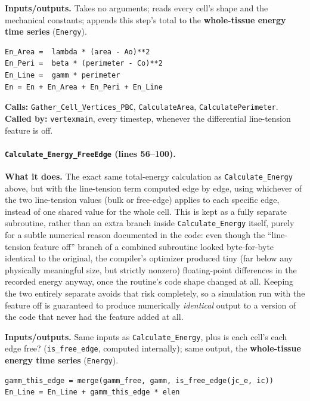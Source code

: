 \documentclass[11pt]{article}
\begin{document}
\textbf{Inputs/outputs.} Takes no arguments; reads every cell's shape and the
mechanical constants; appends this step's total to the \textbf{whole-tissue energy time
series} (\texttt{Energy}).

\begin{lstlisting}[caption={The three energy terms summed per cell in \texttt{Calculate\_Energy}.}]
En_Area =  lambda * (area - Ao)**2
En_Peri =  beta * (perimeter - Co)**2
En_Line =  gamm * perimeter
En = En + En_Area + En_Peri + En_Line
\end{lstlisting}

\textbf{Calls:} \texttt{Gather\_Cell\_Vertices\_PBC}, \texttt{CalculateArea},
\texttt{CalculatePerimeter}. \textbf{Called by:} \texttt{vertexmain}, every timestep,
whenever the differential line-tension feature is off.

\paragraph{\texttt{Calculate\_Energy\_FreeEdge} (lines 56--100).}
\textbf{What it does.} The exact same total-energy calculation as
\texttt{Calculate\_Energy} above, but with the line-tension term computed edge by edge,
using whichever of the two line-tension values (bulk or free-edge)
applies to each specific edge, instead of one shared value for the whole cell. This is
kept as a fully separate subroutine, rather than an extra branch inside
\texttt{Calculate\_Energy} itself, purely for a subtle numerical reason documented in
the code: even though the ``line-tension feature off'' branch of a combined subroutine
looked byte-for-byte identical to the original, the compiler's optimizer produced tiny
(far below any physically meaningful size, but strictly nonzero) floating-point
differences in the recorded energy anyway, once the routine's code shape changed at
all. Keeping the two entirely separate avoids that risk completely, so a simulation run
with the feature off is guaranteed to produce numerically \emph{identical} output to a
version of the code that never had the feature added at all.

\textbf{Inputs/outputs.} Same inputs as \texttt{Calculate\_Energy}, plus is each cell's
each edge free? (\texttt{is\_free\_edge}, computed internally); same output, the
\textbf{whole-tissue energy time series} (\texttt{Energy}).

\begin{lstlisting}[caption={The per-edge line-tension sum in \texttt{Calculate\_Energy\_FreeEdge}.}]
gamm_this_edge = merge(gamm_free, gamm, is_free_edge(jc_e, ic))
En_Line = En_Line + gamm_this_edge * elen
\end{lstlisting}
\end{document}
